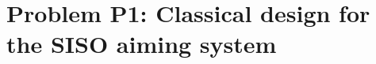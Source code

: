 \documentclass{tron}
\begin{document}
\maketitle
\clearpage
{}
\setcounter{page}{1}
\setlength{\parskip}{5pt}
\newpage


\section{Problem P1: Classical design for the SISO aiming system}
\vspace{5pt}
\end{document}
